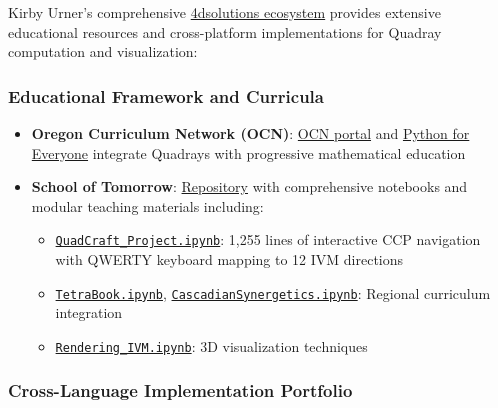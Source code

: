 \documentclass[
  10pt,
]{article}
\providecommand{\tightlist}{%
  \setlength{\itemsep}{0pt}\setlength{\parskip}{0pt}}
\begin{document}
Kirby Urner's comprehensive
\href{https://github.com/4dsolutions}{4dsolutions ecosystem} provides
extensive educational resources and cross-platform implementations for
Quadray computation and visualization:

\hypertarget{educational-framework-and-curricula}{%
\subsubsection{Educational Framework and
Curricula}\label{educational-framework-and-curricula}}

\begin{itemize}
\tightlist
\item
  \textbf{Oregon Curriculum Network (OCN)}:
  \href{http://www.4dsolutions.net/ocn/}{OCN portal} and
  \href{http://www.4dsolutions.net/ocn/pymath.html}{Python for Everyone}
  integrate Quadrays with progressive mathematical education
\item
  \textbf{School of Tomorrow}:
  \href{https://github.com/4dsolutions/School_of_Tomorrow}{Repository}
  with comprehensive notebooks and modular teaching materials including:

  \begin{itemize}
  \tightlist
  \item
    \href{https://github.com/4dsolutions/School_of_Tomorrow/blob/master/QuadCraft_Project.ipynb}{\texttt{QuadCraft\_Project.ipynb}}:
    1,255 lines of interactive CCP navigation with QWERTY keyboard
    mapping to 12 IVM directions
  \item
    \href{https://github.com/4dsolutions/School_of_Tomorrow/blob/master/TetraBook.ipynb}{\texttt{TetraBook.ipynb}},
    \href{https://github.com/4dsolutions/School_of_Tomorrow/blob/master/CascadianSynergetics.ipynb}{\texttt{CascadianSynergetics.ipynb}}:
    Regional curriculum integration
  \item
    \href{https://github.com/4dsolutions/School_of_Tomorrow/blob/master/Rendering_IVM.ipynb}{\texttt{Rendering\_IVM.ipynb}}:
    3D visualization techniques
  \end{itemize}
\end{itemize}

\hypertarget{cross-language-implementation-portfolio}{%
\subsubsection{Cross-Language Implementation
Portfolio}\label{cross-language-implementation-portfolio}}
\end{document}
